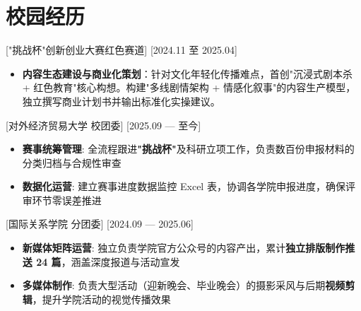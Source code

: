 \documentclass[a4paper]{resume}
\begin{document}
\section{校园经历}

["挑战杯"创新创业大赛红色赛道]
[2024.11 至 2025.04]
{
  \begin{itemize}
    \item \textbf{内容生态建设与商业化策划}：针对文化年轻化传播难点，首创"沉浸式剧本杀 + 红色教育"核心构想。构建"多线剧情架构 + 情感化叙事"的内容生产模型，独立撰写商业计划书并输出标准化实操建议。
  \end{itemize}
}

[对外经济贸易大学 校团委]
[2025.09 — 至今]
{
  \begin{itemize}
    \item \textbf{赛事统筹管理}: 全流程跟进\textbf{"挑战杯"}及科研立项工作，负责数百份申报材料的分类归档与合规性审查
    \item \textbf{数据化运营}: 建立赛事进度数据监控 Excel 表，协调各学院申报进度，确保评审环节零误差推进
  \end{itemize}
}

[国际关系学院 分团委]
[2024.09 — 2025.06]
{
  \begin{itemize}
    \item \textbf{新媒体矩阵运营}: 独立负责学院官方公众号的内容产出，累计\textbf{独立排版制作推送 24 篇}，涵盖深度报道与活动宣发
    \item \textbf{多媒体制作}: 负责大型活动（迎新晚会、毕业晚会）的摄影采风与后期\textbf{视频剪辑}，提升学院活动的视觉传播效果
  \end{itemize}
}
\end{document}
